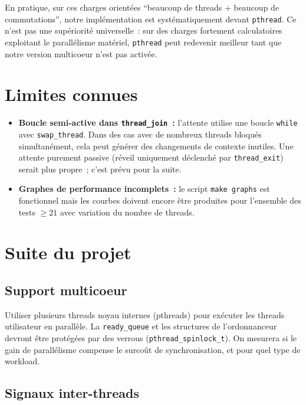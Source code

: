 \documentclass[11pt,a4paper]{article}
\begin{document}
En pratique, sur ces charges orient\'ees ``beaucoup de threads + beaucoup de
commutations'', notre impl\'ementation est syst\'ematiquement devant \texttt{pthread}.
Ce n'est pas une sup\'eriorit\'e universelle~: sur des charges fortement
calculatoires exploitant le parall\'elisme mat\'eriel, \texttt{pthread} peut
redevenir meilleur tant que notre version multicoeur n'est pas activ\'ee.


\section{Limites connues}

\begin{itemize}[noitemsep]
  \item \textbf{Boucle semi-active dans \texttt{thread\_join}~:} l'attente utilise
        une boucle \texttt{while} avec \texttt{swap\_thread}. Dans des cas avec de
        nombreux threads bloqu\'es simultan\'ement, cela peut g\'en\'erer des
        changements de contexte inutiles. Une attente purement passive (r\'eveil
        uniquement d\'eclench\'e par \texttt{thread\_exit}) serait plus propre~;
        c'est pr\'evu pour la suite.
  \item \textbf{Graphes de performance incomplets~:} le script \texttt{make graphs}
        est fonctionnel mais les courbes doivent encore \^etre produites pour
        l'ensemble des tests $\geq 21$ avec variation du nombre de threads.
\end{itemize}

\section{Suite du projet}

\subsection{Support multicoeur}

Utiliser plusieurs threads noyau internes (pthreads) pour ex\'ecuter les threads
utilisateur en parall\`ele. La \texttt{ready\_queue} et les structures de
l'ordonnanceur devront \^etre prot\'eg\'ees par des verrous
(\texttt{pthread\_spinlock\_t}). On mesurera si le gain de parall\'elisme compense
le surco\^ut de synchronisation, et pour quel type de workload.

\subsection{Signaux inter-threads}
\end{document}
